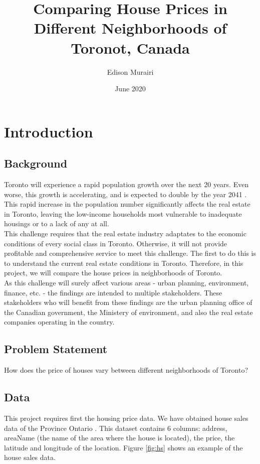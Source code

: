 \documentclass{article}
\title{Comparing House Prices in Different Neighborhoods of Toronot, Canada}
\author{Edison Murairi }
\date{June 2020}
\begin{document}
\maketitle

\section{Introduction}
\subsection{Background}
Toronto will experience a rapid population growth over the next 20 years. Even worse, this growth is accelerating, and is expected to double by the year 2041 \cite{toronto}. This rapid increase in the population number significantly affects the real estate in Toronto, leaving the low-income households most vulnerable to inadequate housings or to a lack of any at all. \\

This challenge requires that the real estate industry adaptates  to the economic conditions of every social class in Toronto. Otherwise, it will not provide profitable and comprehensive service to meet this challenge. The first to do this is to understand the current real estate conditions in Toronto. Therefore, in this project, we will compare the house prices in neighborhoods of Toronto. \\

As this challenge will surely affect various areas - urban planning, environment, finance, etc. - the findings are intended to multiple stakeholders. These stakeholders who will benefit from these findings are the urban planning office of the Canadian government, the Ministery of environment, and also the real estate companies operating in the country.

\subsection{Problem Statement}
How does the price of houses vary between different neighborhoods of Toronto?

\subsection{Data}
This project requires first the housing price data. We have obtained house sales data of the Province Ontario \cite{houses_sale}. This dataset contains 6 columns: address, areaName (the name of the area where the house is located), the price, the latitude and longitude of the location. Figure \ref{fig:hs} shows an example of the house sales data.\\
\end{document}
